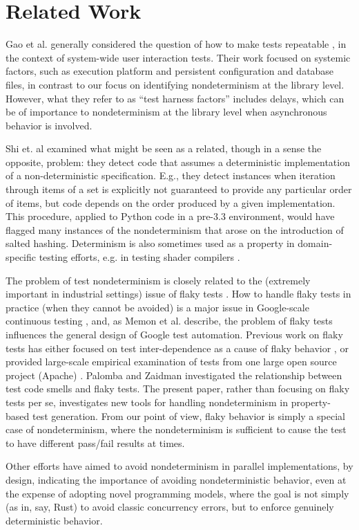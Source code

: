\section{Related Work}

Gao et al. generally considered the question of how to make tests repeatable \cite{Gao:2015:MSU:2818754.2818764}, in the context of system-wide user interaction tests.  Their work focused on systemic factors, such as execution platform and persistent configuration and database files, in contrast to our focus on identifying nondeterminism at the library level.  However, what they refer to as ``test harness factors'' includes delays, which can be of importance to nondeterminism at the library level when asynchronous behavior is involved.

Shi et. al \cite{DetermImp} examined what might be seen as a related, though in a sense the opposite, problem:  they detect code that assumes a deterministic implementation of a non-deterministic specification.  E.g., they detect instances when  iteration through items of a set is explicitly not guaranteed to provide any particular order of items, but code depends on the order produced by a given implementation.  This procedure, applied to Python code in a pre-3.3 environment, would have flagged many instances of the nondeterminism that arose on the introduction of salted hashing.  Determinism is also sometimes used as a property in domain-specific testing efforts, e.g. in testing shader compilers \cite{shader}.

The problem of test nondeterminism is closely related to the (extremely important in industrial settings) issue of flaky tests \cite{miccoflaky, luo2014empirical,palomba2017does,listfieldtestanalysis}.  How to handle flaky tests in practice (when they cannot be avoided) is a major issue in Google-scale continuous testing \cite{memon2017taming}, and, as Memon et al. describe, the problem of flaky tests influences the general design of Google test automation.
Previous work on flaky tests has either focused on test inter-dependence as a cause of flaky behavior \cite{LamZE2015}, or provided large-scale empirical examination of tests from one large open source project (Apache) \cite{luo2014empirical,palomba2017does}.  Palomba and Zaidman \cite{palomba2017does} investigated the relationship between test code smells and flaky tests.   The present paper, rather than focusing on flaky tests per se, investigates new tools for handling nondeterminism in property-based test generation.  From our point of view, flaky behavior is simply a special case of nondeterminism, where the nondeterminism is sufficient to cause the test to have different pass/fail results at times.

Other efforts \cite{ParallelDeterministic} have aimed to avoid nondeterminism in parallel implementations, by design, indicating the importance of avoiding nondeterministic behavior, even at the expense of adopting novel programming models, where the goal is not simply (as in, say, Rust) to avoid classic concurrency errors, but to enforce genuinely deterministic behavior.  

